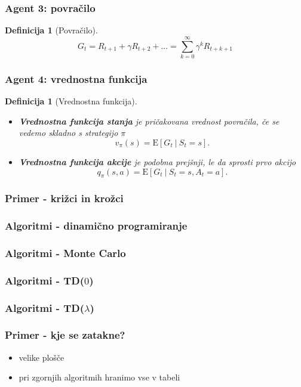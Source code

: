 \documentclass{beamer}    %
\newtheorem{definicija}[izrek]{Definicija}
\begin{document}
\begin{frame}
    \frametitle{Agent 3: povračilo}
    \begin{definicija}[Povračilo]
        $$
        G_t = R_{t+1} + \gamma R_{t+2} + ... = \sum_{k=0}^\infty \gamma^k R_{t + k + 1}
        $$
    \end{definicija}
\end{frame}


\begin{frame}
    \frametitle{Agent 4: vrednostna funkcija}
    \begin{definicija}[Vrednostna funkcija]
        \begin{itemize}
            \item \textbf{Vrednostna funkcija stanja} je pričakovana vrednost povračila, če se 
                    vedemo skladno s strategijo $\pi$ 
                    $$
                    v_\pi(s) = \mathrm{E} [G_t~|~S_t = s].
                    $$
            \item \textbf{Vrednostna funkcija akcije} je podobna prejšnji, le da sprosti prvo akcijo 
                    $$
                    q_\pi(s, a) = \mathrm{E} [G_t~|~S_t = s, A_t = a].
                    $$
        \end{itemize}
    \end{definicija}
\end{frame}


\begin{frame}
    \frametitle{Primer - križci in krožci}
\end{frame}


\begin{frame}
    \frametitle{Algoritmi - dinamično programiranje}
\end{frame}


\begin{frame}
    \frametitle{Algoritmi - Monte Carlo}
\end{frame}


\begin{frame}
    \frametitle{Algoritmi - TD($0$)}
\end{frame}


\begin{frame}
    \frametitle{Algoritmi - TD($\lambda$)}
\end{frame}


\begin{frame}
    \frametitle{Primer - kje se zatakne?}
    \begin{itemize}
        \item velike plošče
        \item pri zgornjih algoritmih hranimo vse v tabeli
    \end{itemize}
\end{frame}
\end{document}
